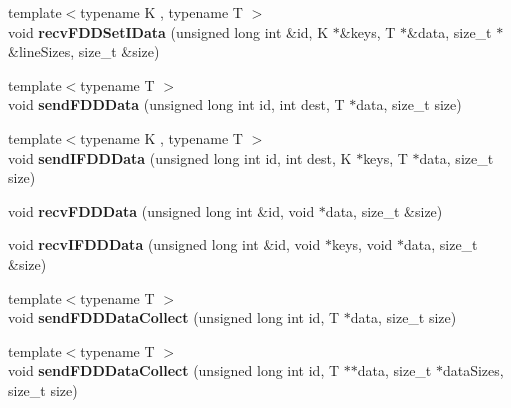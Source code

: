 \begin{DoxyCompactItemize}
\item 
\hypertarget{classfaster_1_1fastComm_a5f9da47ecd49c3456777bec1815c0600}{}\label{classfaster_1_1fastComm_a5f9da47ecd49c3456777bec1815c0600} 
{\footnotesize template$<$typename K , typename T $>$ }\\void {\bfseries recv\+F\+D\+D\+Set\+I\+Data} (unsigned long int \&id, K $\ast$\&keys, T $\ast$\&data, size\+\_\+t $\ast$\&line\+Sizes, size\+\_\+t \&size)
\item 
\hypertarget{classfaster_1_1fastComm_a0b67f926ff07626bec61c04fe3da36ef}{}\label{classfaster_1_1fastComm_a0b67f926ff07626bec61c04fe3da36ef} 
{\footnotesize template$<$typename T $>$ }\\void {\bfseries send\+F\+D\+D\+Data} (unsigned long int id, int dest, T $\ast$data, size\+\_\+t size)
\item 
\hypertarget{classfaster_1_1fastComm_aa26227cfe5edb65b68b9e0198ae69e94}{}\label{classfaster_1_1fastComm_aa26227cfe5edb65b68b9e0198ae69e94} 
{\footnotesize template$<$typename K , typename T $>$ }\\void {\bfseries send\+I\+F\+D\+D\+Data} (unsigned long int id, int dest, K $\ast$keys, T $\ast$data, size\+\_\+t size)
\item 
\hypertarget{classfaster_1_1fastComm_af880244a1924f6647f8c2d40a59853ef}{}\label{classfaster_1_1fastComm_af880244a1924f6647f8c2d40a59853ef} 
void {\bfseries recv\+F\+D\+D\+Data} (unsigned long int \&id, void $\ast$data, size\+\_\+t \&size)
\item 
\hypertarget{classfaster_1_1fastComm_a34a8ad79fda6a1146df90a13c14b95a3}{}\label{classfaster_1_1fastComm_a34a8ad79fda6a1146df90a13c14b95a3} 
void {\bfseries recv\+I\+F\+D\+D\+Data} (unsigned long int \&id, void $\ast$keys, void $\ast$data, size\+\_\+t \&size)
\item 
\hypertarget{classfaster_1_1fastComm_a708657fc9279d7a360a5f3102f91b36a}{}\label{classfaster_1_1fastComm_a708657fc9279d7a360a5f3102f91b36a} 
{\footnotesize template$<$typename T $>$ }\\void {\bfseries send\+F\+D\+D\+Data\+Collect} (unsigned long int id, T $\ast$data, size\+\_\+t size)
\item 
\hypertarget{classfaster_1_1fastComm_acba48eca1ae4a1934dfdd80652c98cf6}{}\label{classfaster_1_1fastComm_acba48eca1ae4a1934dfdd80652c98cf6} 
{\footnotesize template$<$typename T $>$ }\\void {\bfseries send\+F\+D\+D\+Data\+Collect} (unsigned long int id, T $\ast$$\ast$data, size\+\_\+t $\ast$data\+Sizes, size\+\_\+t size)
\item 
$$
\end{DoxyCompactItemize}
